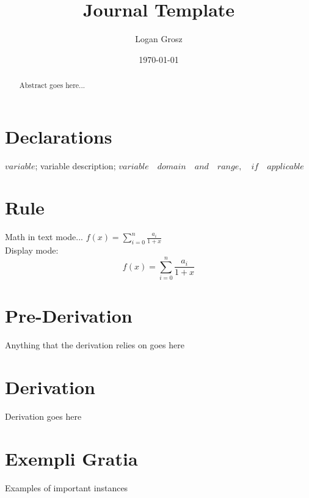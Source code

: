 \documentclass{article}
\begin{document}
	
\author{Logan Grosz}
\title{Journal Template}
\date{\today}

\maketitle

\begin{abstract}
	Abstract goes here...
\end{abstract}

\section{Declarations}

$variable$; variable description; $variable\quad domain\quad and\quad range,\quad if\quad applicable$

\section{Rule}

Math in text mode... \( f(x) = \sum_{i=0}^{n} \frac{a_i}{1+x} \)\\

Display mode: \\
\[ f(x) = \sum_{i=0}^{n} \frac{a_i}{1+x} \]

\section{Pre-Derivation}
Anything that the derivation relies on goes here

\section{Derivation}

Derivation goes here

\section{Exempli Gratia}

Examples of important instances
\end{document}
